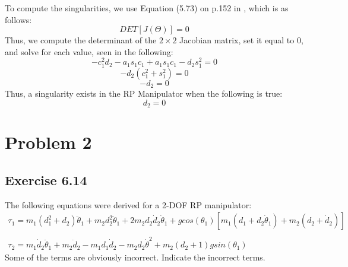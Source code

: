 \documentclass[10pt]{article}
\begin{document}
To compute the singularities, we use Equation (5.73) on p.152 in \cite{textbook}, which is as follows:
\[DET[J(\Theta)] = 0\]
Thus, we compute the determinant of the \(2 \times 2\) Jacobian matrix, set it equal to 0, and solve for each value, seen in the following:
\[
-c_{1}^2d_{2} - a_{1}s_{1}c_{1} + a_{1}s_{1}c_{1} - d_{2}s_{1}^2 = 0
\]
\[
-d_{2}(c_{1}^2 + s_{1}^2) = 0
\]
\[
-d_{2} = 0
\]
Thus, a singularity exists in the RP Manipulator when the following is true:
\[
d_{2} = 0
\]
\pagebreak
\section*{Problem 2} %
\subsection*{Exercise 6.14}
The following equations were derived for a 2-DOF RP manipulator:
\[
\begin{array}{l}
    \tau_{1} = m_{1}(d^{2}_{1} + d_{2})\ddot{\theta}_1 + 
				m_{2} d^{2}_{2}\ddot{\theta}_{1} + 
				2m_{2}d_{2}\dot{d}_{2}\dot{\theta}_{1} +
				g cos(\theta_{1})[m_{1}(d_{1} + d_{2}\dot{\theta}_{1}) + m_{2}(d_{2} + \dot{d}_{2})]\\ \\
    \tau_{2} = m_{1}\dot{d}_{2}\ddot{\theta}_{1} + m_{2}\ddot{d}_{2} - m_{1}d_{1}\dot{d}_2 - m_{2}d_{2}\dot{\theta}^2 + m_{2}(d_{2} + 1)g sin(\theta_{1})
\end{array}
\]
Some of the terms are obviously incorrect. Indicate the incorrect terms.
\end{document}
